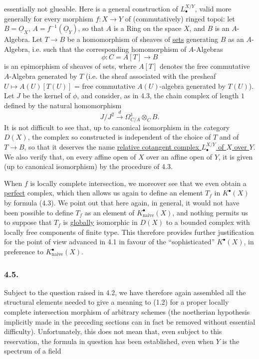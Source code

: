 essentially not glueable. Here is a general construction of $L^{X/Y}_\bullet$, valid more generally for every morphism $f:X\to Y$ of (commutatively) ringed topoi: let $B=\underline O_X$, $A=f^{-1}(\underline O_Y)$, so that $A$ is a Ring on the space $X$, and $B$ is an $A$-Algebra. Let $T\to B$ be a homomorphism of sheaves of \underline{sets} generating $B$ as an $A$-Algebra, i.e. such that the corresponding homomorphism of $A$-Algebras
\[
\phi:C=A[T]\longrightarrow B
\]
is an epimorphism of sheaves of sets, where $A[T]$ denotes the free commutative $A$-Algebra generated by $T$ (i.e. the sheaf associated with the presheaf $U\longmapsto A(U)[T(U)]$ = free commutative $A(U)$-algebra generated by $T(U)$).
Let $J$ be the kernel of $\phi$, and consider, as in 4.3, the chain complex of length $1$ defined by the natural homomorphism
\[
J/J^2\xrightarrow{d}\Omega^1_{C/A}\otimes_C B.
\]
It is not difficult to see that, up to canonical isomorphism in the category $D(X)$, the complex so constructed is independent of the choice of $T$ and of $T\to B$, so that it deserves the name \uline{relative cotangent complex $L^{X/Y}_\bullet$ of $X$ over $Y$}. We also verify that, on every affine open of $X$ over an affine open of $Y$, it is given (up to canonical isomorphism) by the procedure of 4.3.

When $f$ is locally complete intersection, we moreover see that we even obtain a \underline{perfect} complex, which then allows us again to define an element $T_f$ in $K^\bullet(X)$ by formula (4.3). We point out that here again, in general, it would not have been possible to define $T_f$ as an element of $K^\bullet_{\mathrm{naive}}(X)$, and nothing permits us to suppose that $T_f$ is \underline{globally} isomorphic in $D(X)$ to a bounded complex with locally free components of finite type. This therefore provides further justification for the point of view advanced in 4.1 in favour of the ``sophisticated'' $K^\bullet(X)$, in preference to $K^\bullet_{\mathrm{naive}}(X)$.

\subsubsection*{4.5.}
Subject to the question raised in 4.2, we have therefore again assembled all the structural elements needed to give a meaning to (1.2) for a proper locally complete intersection morphism of arbitrary schemes (the noetherian hypothesis implicitly made in the preceding sections can in fact be removed without essential difficulty). Unfortunately, this does not mean that, even subject to this reservation, the formula in question has been established, even when $Y$ is the spectrum of a field

